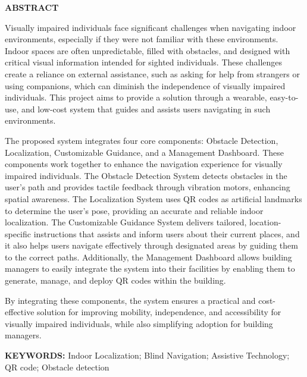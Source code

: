 

\newpage
\thispagestyle{plain}
\setcounter{page}{1}
\renewcommand{\thepage}{\roman{page}}

\begin{center}
    \Large\textbf{ABSTRACT}
\end{center}
\vspace{6pt}
Visually impaired individuals face significant challenges when navigating indoor environments, especially if they were not familiar with these environments. Indoor spaces are often unpredictable, filled with obstacles, and designed with critical visual information intended for sighted individuals. These challenges create a reliance on external assistance, such as asking for help from strangers or using companions, which can diminish the independence of visually impaired individuals. This project aims to provide a solution through a wearable, easy-to-use, and low-cost system that guides and assists users navigating in such environments. 

The proposed system integrates four core components: Obstacle Detection, Localization, Customizable Guidance, and a Management Dashboard. These components work together to enhance the navigation experience for visually impaired individuals. The Obstacle Detection System detects obstacles in the user’s path and provides tactile feedback through vibration motors, enhancing spatial awareness. The Localization System uses QR codes as artificial landmarks to determine the user's pose, providing an accurate and reliable indoor localization. The Customizable Guidance System delivers tailored, location-specific instructions that assists and inform users about their current places, and it also helps users navigate effectively through designated areas by guiding them to the correct paths. Additionally, the Management Dashboard allows building managers to easily integrate the system into their facilities by enabling them to generate, manage, and deploy QR codes within the building.

By integrating these components, the system ensures a practical and cost-effective solution for improving mobility, independence, and accessibility for visually impaired individuals, while also simplifying adoption for building managers.

\vspace{18pt}
\noindent
\textbf{KEYWORDS:} Indoor Localization; Blind Navigation; Assistive Technology; QR code; Obstacle detection
\vspace{3\baselineskip}